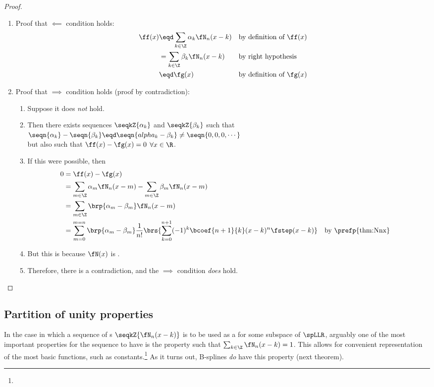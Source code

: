 \begin{proof}
\begin{enumerate}
  \item Proof that $\impliedby$ condition holds:
    \begin{align*}
      \ff(x)
        &\eqd \sum_{k\in\Z} \alpha_k \fN_n(x-k)
        &&    \text{by definition of $\ff(x)$}
      \\&=    \sum_{k\in\Z} \beta_k \fN_n(x-k)
        &&    \text{by right hypothesis}
      \\&\eqd \fg(x)
        &&    \text{by definition of $\fg(x)$}
    \end{align*}

  \item Proof that $\implies$ condition holds (proof by contradiction):
    \begin{enumerate}
      \item Suppose it does \emph{not} hold.
      \item Then there exists sequences $\seqkZ{\alpha_k}$ and $\seqkZ{\beta_k}$ such that
        \\\indentx$\seqn{\alpha_k}-\seqn{\beta_k}\eqd\seqn{alpha_k-\beta_k}\neq\seqn{0,0,0,\cdots}$\\
        but also such that $\ff(x)-\fg(x)=0$ $\forall x\in\R$.
      \item If this were possible, then
        \begin{align*}
          0
            &= \ff(x)-\fg(x)
          \\&= \sum_{m\in\Z}\alpha_m \fN_n(x-m) - \sum_{m\in\Z}\beta_m \fN_n(x-m)
          \\&= \sum_{m\in\Z}\brp{\alpha_m-\beta_m} \fN_n(x-m)
          \\&= \sum_{m=0}^{m=n} \brp{\alpha_m-\beta_m} \frac{1}{n!} \brs{\sum_{k=0}^{n+1} (-1)^k \bcoef{n+1}{k} (x-k)^{n} \fstep(x-k)}
            && \text{by \prefp{thm:Nnx}}
        \end{align*}
      \item But this is  because $\fN(x)$ is  .
      \item Therefore, there is a contradiction, and the $\implies$ condition \emph{does} hold.
    \end{enumerate}
\end{enumerate}
\end{proof}

\subsection{Partition of unity properties}
In the case in which a sequence of s $\seqkZ{\fN_n(x-k)}$
is to be used as a  for some subspace of $\spLLR$,
arguably one of the most important properties for the sequence to have is the  property
such that $\sum_{k\in\Z}\fN_n(x-k)=1$.
This allows for convenient representation of the most basic functions, such as constants.\footnote{}
As it turns out, B-splines \emph{do} have this property (next theorem).

